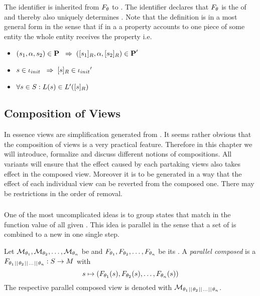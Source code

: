 \documentclass[preview]{standalone}
\begin{document}
The identifier \viewppty is inherited from $\grpfct$ to \view. The identifier declares that $\grpfct$ is the \grpfctN of \view and thereby also uniquely determines \view. Note that the definition is in a most general form in the sense that if in a \viewN a property accounts to one piece of some entity the whole entity receives the property i.e. 
\begin{itemize}	
	\item $(\state_1, \action, \state_2) \in \trans \impr (\eqclassv[\state_1], \action, \eqclassv[\state_2]) \in \trans'$
	\item $\state \in \init \impr \eqclassv \in \initdistrib'$
	\item $\forall \state \in \states : \labelingfct(\state) \in \labelingfct'(\eqclassv)$
\end{itemize}



\subsection{Composition of Views}
In essence views are simplification generated from \chosengraphtypeN. It seems rather obvious that the composition of views is a very practical feature. Therefore in this chapter we will introduce, formalize and discuss different notions of compositions. All variants will ensure that the effect caused by each partaking views also takes effect in the composed view. Moreover it is to be generated in a way that the effect of each individual view can be reverted from the composed one. There may be restrictions in the order of removal.

\subsubsection{\parllcompNCC}
One of the most uncomplicated ideas is to group states that match in the function value of all given \grpfctsN. This idea is parallel in the sense that a set of \grpfctN is combined to a new \grpfctN in one single step.
\begin{definition}
	Let $\view[\viewppty_1], \view[\viewppty_2], \dots, \view[\viewppty_n]$ be \viewsN and  $\grpfct[\viewppty_1], \grpfct[\viewppty_2], \dots, \grpfct[\viewppty_n]$ be its \grpfctsN. A \emph{parallel composed \grpfctN} is a \grpfctN $\grpfct[{\viewppty_1 \pll \viewppty_2 \pll \dots \pll \viewppty_n}]: \states \to \arbset$ with
	\[
	\state \mapsto (\grpfct[\viewppty_1](\state), \grpfct[\viewppty_2](\state), \dots, \grpfct[\viewppty_n](\state))
	\] 
	The respective parallel composed view is denoted with $\view[\viewppty_1 \pll \viewppty_2 \pll \dots \pll 
	\viewppty_n]$.
		
\end{definition}
\end{document}
